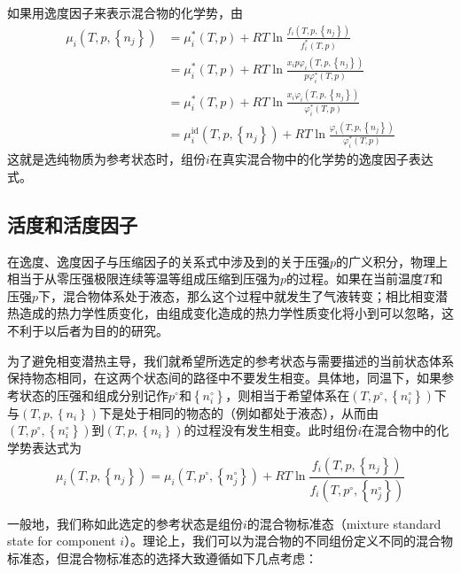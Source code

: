 \documentclass[main.tex]{subfiles}
\begin{document}
如果用逸度因子来表示混合物的化学势，由
\begin{align*}
    \mu_i\left(T,p,\left\{n_j\right\}\right) & =\mu_i^*\left(T,p\right)+RT\ln\frac{f_i\left(T,p,\left\{n_j\right\}\right)}{f_i^*\left(T,p\right)}                                        \\
                                             & =\mu_i^*\left(T,p\right)+RT\ln\frac{x_ip\varphi_i\left(T,p,\left\{n_j\right\}\right)}{p\varphi_i^*\left(T,p\right)}                       \\
                                             & =\mu_i^*\left(T,p\right)+RT\ln\frac{x_i\varphi_i\left(T,p,\left\{n_j\right\}\right)}{\varphi_i^*\left(T,p\right)}                         \\
                                             & =\mu_i^\text{id}\left(T,p,\left\{n_j\right\}\right)+RT\ln\frac{\varphi_i\left(T,p,\left\{n_j\right\}\right)}{\varphi_i^*\left(T,p\right)}
\end{align*}
这就是选纯物质为参考状态时，组份$i$在真实混合物中的化学势的逸度因子表达式。

\subsection{活度和活度因子}
在逸度、逸度因子与压缩因子的关系式中涉及到的关于压强$p$的广义积分，物理上相当于从零压强极限连续等温等组成压缩到压强为$p$的过程。如果在当前温度$T$和压强$p$下，混合物体系处于液态，那么这个过程中就发生了气液转变；相比相变潜热造成的热力学性质变化，由组成变化造成的热力学性质变化将小到可以忽略，这不利于以后者为目的的研究。

为了避免相变潜热主导，我们就希望所选定的参考状态与需要描述的当前状态体系保持物态相同，在这两个状态间的路径中不要发生相变。具体地，同温下，如果参考状态的压强和组成分别记作$p^\circ$和$\left\{n_i^\circ\right\}$，则相当于希望体系在$\left(T,p^\circ,\left\{n_i^\circ\right\}\right)$下与$\left(T,p,\left\{n_i\right\}\right)$下是处于相同的物态的（例如都处于液态），从而由$\left(T,p^\circ,\left\{n_i^\circ\right\}\right)$到$\left(T,p,\left\{n_i\right\}\right)$的过程没有发生相变。此时组份$i$在混合物中的化学势表达式为
\begin{equation}\label{eq:II.4_mu_standard_state}
    \mu_i\left(T,p,\left\{n_j\right\}\right)=\mu_i\left(T,p^\circ,\left\{n_j^\circ\right\}\right)+RT\ln\frac{f_i\left(T,p,\left\{n_j\right\}\right)}{f_i\left(T,p^\circ,\left\{n_j^\circ\right\}\right)}
\end{equation}

一般地，我们称如此选定的参考状态是组份$i$的混合物标准态（mixture standard state for component $i$）。理论上，我们可以为混合物的不同组份定义不同的混合物标准态，但混合物标准态的选择大致遵循如下几点考虑：
\end{document}

